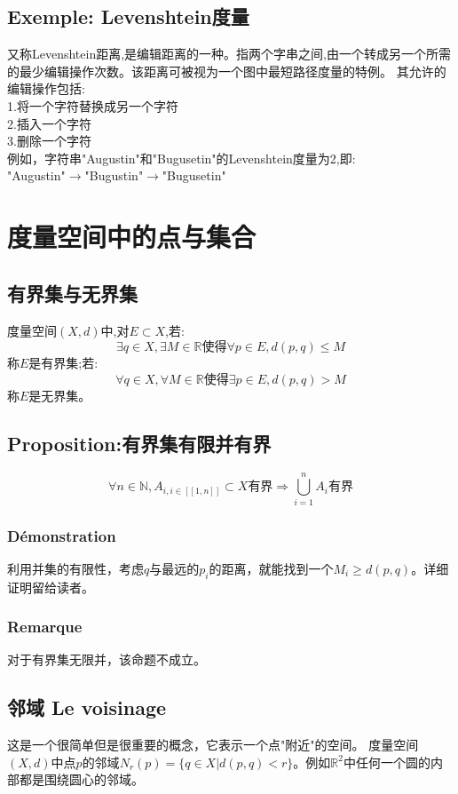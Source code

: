\documentclass[12pt, a4paper, oneside]{ctexbook}
\begin{document}
  \subsection{Exemple: Levenshtein度量}
  又称Levenshtein距离,是编辑距离的一种。指两个字串之间,由一个转成另一个所需的最少编辑操作次数。该距离可被视为一个图中最短路径度量的特例。
  其允许的编辑操作包括:\\
  1.将一个字符替换成另一个字符\\
  2.插入一个字符\\
  3.删除一个字符\\
  例如，字符串"Augustin"和"Bugusetin"的Levenshtein度量为2,即:\\
  
  "Augustin"$\rightarrow$"Bugustin"$\rightarrow$"Bugusetin"


\section{度量空间中的点与集合}
  \subsection{有界集与无界集}
  度量空间$(X,d)$中,对$E\subset X$,若:
  $$
    \exists q\in X , \exists M\in \mathbb{R}\text{使得}\forall p\in E,d(p,q)\leq M
  $$称$E$是有界集;若:
  $$
    \forall q\in X , \forall M\in \mathbb{R}\text{使得}\exists p\in E,d(p,q)> M
  $$称$E$是无界集。
  \subsection{Proposition:有界集有限并有界}
  $$
  \forall n\in \mathbb{N},A_{i,i\in [\![1,n]\!]}\subset X\text{有界}\Rightarrow \bigcup_{i=1}^n A_i\text{有界}
  $$
  \subsubsection{Démonstration}
  利用并集的有限性，考虑$q$与最远的$p_i$的距离，就能找到一个$M_i\ge d(p,q)$。详细证明留给读者。
  \subsubsection{Remarque}
  对于有界集无限并，该命题不成立。

  \subsection{邻域 Le voisinage}     \label{myref:voisinage}
  这是一个很简单但是很重要的概念，它表示一个点"附近"的空间。
  度量空间$(X,d)$中点$p$的邻域$N_r(p)=\{q\in X | d(p,q)<r\}$。例如$\mathbb{R}^2$中任何一个圆的内部都是围绕圆心的邻域。
\end{document}
